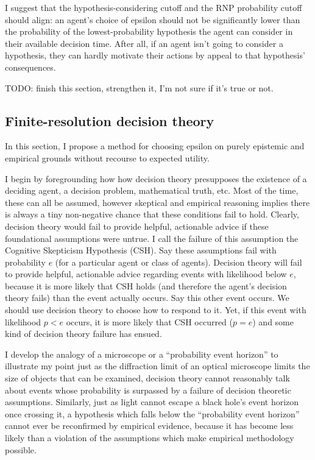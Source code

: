 \documentclass{article}
\begin{document}
I suggest that the hypothesis-considering cutoff and the RNP probability cutoff should align: an agent's choice of epsilon should not be significantly lower than the probability of the lowest-probability hypothesis the agent can consider in their available decision time. After all, if an agent isn't going to consider a hypothesis, they can hardly motivate their actions by appeal to that hypothesis' consequences.

TODO: finish this section, strengthen it, I'm not sure if it's true or not.

\subsection{Finite-resolution decision theory}

In this section, I propose a method for choosing epsilon on purely epistemic and empirical grounds without recourse to expected utility. 

I begin by foregrounding how how decision theory presupposes the existence of a deciding agent, a decision problem, mathematical truth, etc. Most of the time, these can all be assumed, however skeptical and empirical reasoning implies there is always a tiny non-negative chance that these conditions fail to hold. Clearly, decision theory would fail to provide helpful, actionable advice if these foundational assumptions were untrue. I call the failure of this assumption the Cognitive Skepticism Hypothesis (CSH). Say these assumptions fail with probability \(e\) (for a particular agent or class of agents). Decision theory will fail to provide helpful, actionable advice regarding events with likelihood below \(e\), because it is more likely that CSH holds (and therefore the agent's decision theory fails) than the event actually occurs. Say this other event occurs. We should use decision theory to choose how to respond to it. Yet, if this event with likelihood \(p<e\) occurs, it is more likely that CSH occurred (\(p=e\)) and some kind of decision theory failure has ensued.

I develop the analogy of a microscope or a ``probability event horizon'' to illustrate my point \textemdash{} just as the diffraction limit of an optical microscope limits the size of objects that can be examined, decision theory cannot reasonably talk about events whose probability is surpassed by a failure of decision theoretic assumptions. Similarly, just as light cannot escape a black hole's event horizon once crossing it, a hypothesis which falls below the ``probability event horizon'' cannot ever be reconfirmed by empirical evidence, because it has become less likely than a violation of the assumptions which make empirical methodology possible. 
\end{document}
